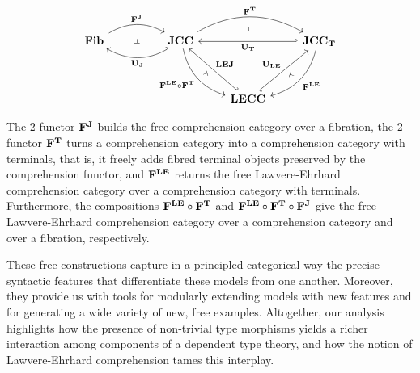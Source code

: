 \documentclass{lmcs} %
\theoremstyle{plain}\newtheorem{satz}[thm]{Satz} %
\begin{document}
\[\begin{tikzcd}
	\Fib && \JComp && \JTComp \\
	\\
	&&& \LComp
	\arrow[""{name=0, anchor=center, inner sep=0}, "\JFree", bend left, from=1-1, to=1-3]
	\arrow[""{name=1, anchor=center, inner sep=0}, "\forgJ", bend left, hook', from=1-3, to=1-1]
	\arrow[""{name=2, anchor=center, inner sep=0}, "\JTFree", bend left, from=1-3, to=1-5]
	\arrow[""{name=3, anchor=center, inner sep=0}, "{\LtoJ}"', from=3-4, to=1-3, hook']
	\arrow[""{name=4, anchor=center, inner sep=0}, "\forgT", hook', from=1-5, to=1-3]
	\arrow[""{name=5, anchor=center, inner sep=0}, "\LEFree", bend left, from=1-5, to=3-4]
	\arrow[""{name=6, anchor=center, inner sep=0}, "\LEFree\arcmp\JTFree"', bend right, from=1-3, to=3-4]
	\arrow[""{name=7, anchor=center, inner sep=0}, "\forgLE", hook', from=3-4, to=1-5]
	\arrow["\dashv"{anchor=center, rotate=-90}, draw=none, from=0, to=1]
	\arrow["\dashv"{anchor=center, rotate=-90}, draw=none, from=2, to=4]
	\arrow["\dashv"{anchor=center, rotate=162}, draw=none, from=5, to=7]
	\arrow["\dashv"{anchor=center, rotate=18}, draw=none, from=6, to=3]
\end{tikzcd}\]

The 2-functor $\mathbf{F^J}$ builds the free comprehension category over a fibration, 
the 2-functor $\mathbf{F^T}$ turns a comprehension category into a comprehension category with terminals, that is, it freely adds fibred terminal objects preserved by the comprehension functor, and 
$\mathbf{F^{LE}}$ returns the free Lawvere-Ehrhard comprehension category over a comprehension category with terminals. 
% 
Furthermore, the compositions $\mathbf{F^{LE}}\circ\mathbf{F^T}$ and $\mathbf{F^{LE}}\circ\mathbf{F^T}\circ\mathbf{F^J}$  give the free Lawvere-Ehrhard comprehension category  over a comprehension category and over a fibration, respectively. 


These free constructions capture in a principled categorical way the precise syntactic features that differentiate these models from one another. 
Moreover, they provide us with tools for modularly extending  models with new features and for generating a wide variety of new, free examples. 
% 
Altogether, our analysis highlights 
how the presence of non-trivial type morphisms yields a richer interaction among components of  a dependent type theory, and 
how the notion of Lawvere-Ehrhard comprehension tames this interplay. 
\end{document}
